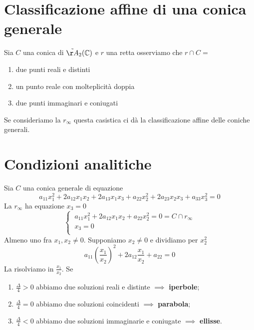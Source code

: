 \documentclass{report}
\begin{document}
\section{Classificazione affine di una conica generale}

Sia \(C\) una conica di \(\tilde{\AA}_{2}(\CC) \) e \(r\) una retta osserviamo che \(r \cap C =\)
\begin{enumerate}
    \item due punti reali e distinti
    \item un punto reale con molteplicità doppia
    \item due punti immaginari e coniugati
\end{enumerate}
Se consideriamo la \(r_{\infty}\) questa casistica ci dà la classificazione affine delle coniche generali.


\section{Condizioni analitiche}
Sia \(C\) una conica generale di equazione \[
a_{11}x_1^2+ 2a_{12}x_1x_2+2a_{13}x_1x_3+a_{22}x_2^2+2a_{23}x_2x_3+a_{33}x_3^2=0
\] 
La \(r_{\infty}\) ha equazione \(x_{3}=0\) \[
\begin{cases}
    \ a_{11}x_1^2+2a_{12}x_1x_2+a_{22}x_2^2= 0 = C \cap r_{\infty} \\
    \ x_3 = 0 \\
\end{cases}
\]
Almeno uno fra \(x_1, x_2 \neq 0\). Supponiamo \(x_2 \neq 0\) e dividiamo per \(x_2^2\) \[
a_{11} \left( \frac{x_1}{x_2} \right) ^2 + 2a_{12} \frac{x_1}{x_2} + a_{22} = 0
\] 
La risolviamo in \(\frac{x_1}{x_2}\). Se 
\begin{enumerate}
    \item \(\frac{\Delta}{4} > 0\) abbiamo due soluzioni reali e distinte \(\implies \) \textbf{iperbole};
    \item \(\frac{\Delta}{4} = 0\) abbiamo due soluzioni coincidenti \(\implies \) \textbf{parabola};
    \item \(\frac{\Delta}{4} < 0\) abbiamo due soluzioni immaginarie e coniugate \(\implies \) \textbf{ellisse}.
\end{enumerate}
\end{document}
